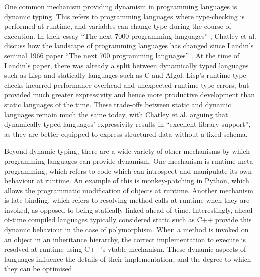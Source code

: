 One common mechanism providing dynamism in programming languages is dynamic typing. This refers to programming languages where type-checking is performed at runtime, and variables can change type during the course of execution.
In their essay ``The next 7000 programming languages'' \cite{chatleyNext7000Programming2019}, Chatley et al. discuss how the landscape of programming languages has changed since Landin's seminal 1966 paper ``The next 700 programming languages'' \cite{landinNext700Programming1966}. At the time of Landin's paper, there was already a split between dynamically typed languages such as Lisp and statically languages such as C and Algol. Lisp's runtime type checks incurred performance overhead and unexpected runtime type errors, but provided much greater expressivity and hence more productive development than static languages of the time. These trade-offs between static and dynamic languages remain much the same today, with Chatley et al. arguing that dynamically typed languages' expressivity results in ``excellent library support'', as they are better equipped to express structured data without a fixed schema.

Beyond dynamic typing, there are a wide variety of other mechanisms by which programming languages can provide dynamism.
One mechanism is runtime meta-programming, which refers to code which can introspect and manipulate its own behaviour at runtime. An example of this is monkey-patching in Python, which allows the programmatic modification of objects at runtime.
Another mechanism is late binding, which refers to resolving method calls at runtime when they are invoked, as opposed to being statically linked ahead of time. Interestingly, ahead-of-time compiled languages typically considered static such as C++ provide this dynamic behaviour in the case of polymorphism. When a method is invoked on an object in an inheritance hierarchy, the correct implementation to execute is resolved at runtime using C++'s vtable mechanism.
These dynamic aspects of languages influence the details of their implementation, and the degree to which they can be optimised.


